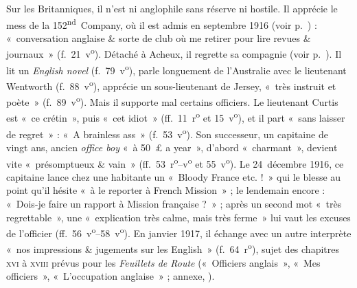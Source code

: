 Sur les Britanniques, il n'est ni anglophile sans réserve ni hostile. Il apprécie le mess de la 152\textsuperscript{nd}~Company, où il est admis en septembre 1916 (voir p.~\pageref{intro:mess}) : «~conversation anglaise \& sorte de club où me retirer pour lire revues \& journaux~» (f.~21~v\textsuperscript{o}). Détaché à Acheux, il regrette sa compagnie (voir p.~\pageref{intro:detache}). Il lit un \textit{English novel} (f.~79~v\textsuperscript{o}), parle longuement de l'Australie avec le lieutenant Wentworth (f.~88~v\textsuperscript{o}), apprécie un sous-lieutenant de Jersey, «~très instruit et poète~» (f.~89~v\textsuperscript{o}). Mais il supporte mal certains officiers. Le lieutenant Curtis est «~ce crétin~», puis «~cet idiot~» (ff.~11~r\textsuperscript{o} et 15~v\textsuperscript{o}), et il part «~sans laisser de regret~» : «~A brainless ass~» (f.~53~v\textsuperscript{o}). Son successeur, un capitaine de vingt ans, ancien \textit{office boy} «~à 50~£ a year~», d'abord «~charmant~», devient vite «~présomptueux \& vain~» (ff.~53~r\textsuperscript{o}--v\textsuperscript{o} et 55~v\textsuperscript{o}). Le 24~décembre 1916\label{intro:bloody}, ce capitaine lance chez une habitante un «~Bloody France etc. !~» qui le blesse au point qu'il hésite «~à le reporter à French Mission~» ; le lendemain encore : «~Dois-je faire un rapport à Mission française ?~» ; après un second mot «~très regrettable~», une «~explication très calme, mais très ferme~» lui vaut les excuses de l'officier (ff.~56~v\textsuperscript{o}--58~v\textsuperscript{o}). En janvier 1917, il échange avec un autre interprète «~nos impressions \& jugements sur les English~» (f.~64~r\textsuperscript{o}), sujet des chapitres \textsc{xvi} à \textsc{xviii} prévus pour les \textit{Feuillets de Route} («~Officiers anglais~», «~Mes officiers~», «~L'occupation anglaise~» ; annexe, ).

